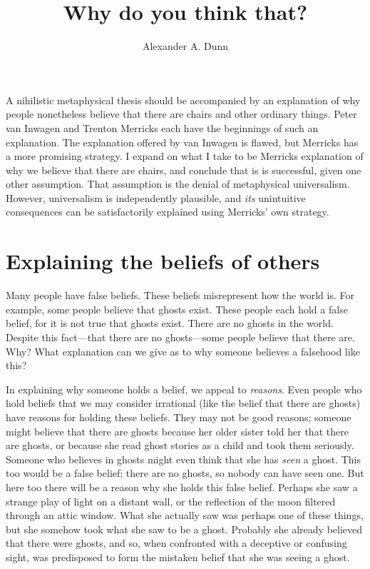 \documentclass[11pt]{article}
\title{Why do you think that?}
\author{Alexander A. Dunn}
\begin{document}
\ifstandalone
\maketitle
\begin{spacing}{1.5}
\fi
\label{stroud}

A nihilistic metaphysical thesis should be accompanied by an
explanation of why people nonetheless believe that there are chairs
and other ordinary things.  Peter van Inwagen and Trenton Merricks
each have the beginnings of such an explanation.  The explanation
offered by van Inwagen is flawed, but Merricks has a more promising
strategy.  I expand on what I take to be Merricks explanation of why
we believe that there are chairs, and conclude that is is successful,
given one other assumption.  That assumption is the denial of
metaphysical universalism.  However, universalism is independently
plausible, and {\em its} unintuitive consequences can be
satisfactorily explained using Merricks' own strategy.

\section{Explaining the beliefs of others}
\label{intro-beliefs}
\noindent Many people have false beliefs.  These beliefs misrepresent
how the world is.  For example, some people believe that ghosts exist.
These people each hold a false belief, for it is not true that ghosts
exist.  There are no ghosts in the world.  Despite this fact---that
there are no ghosts---some people believe that there are.  Why?  What
explanation can we give as to why someone believes a falsehood like
this?

In explaining why someone holds a belief, we appeal to {\em reasons}.
Even people who hold beliefs that we may consider irrational (like the
belief that there are ghosts) have reasons for holding these beliefs.
They may not be good reasons; someone might believe that there are
ghosts because her older sister told her that there are ghosts, or
because she read ghost stories as a child and took them seriously.
Someone who believes in ghosts might even think that she has {\em
  seen} a ghost.  This too would be a false belief; there are no
ghosts, so nobody can have seen one.  But here too there will be a
reason why she holds this false belief.  Perhaps she saw a strange
play of light on a distant wall, or the reflection of the moon
filtered through an attic window.  What she actually saw was perhaps
one of these things, but she somehow took what she saw to be a ghost.
Probably she already believed that there were ghosts, and so, when
confronted with a deceptive or confusing sight, was predisposed to
form the mistaken belief that she was seeing a ghost.


\end{spacing}
\end{document}
